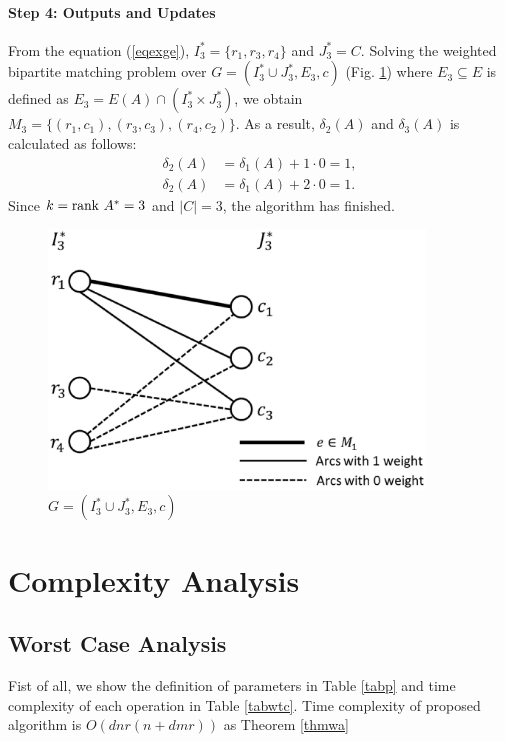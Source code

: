 \begin{example}
\paragraph{Step 4: Outputs and Updates\\} 
From the equation (\ref{eqexge}), $ I^{\ast}_3 = \{ r_1 , r_3, r_4\} $ and $ J^{\ast}_3 = C $.
Solving the weighted bipartite matching problem over $ G = ( I^{\ast}_3 \cup J^{\ast}_3 , E_3 , c ) $ (Fig. \ref{figwm}) where $ E_3 \subseteq E $ is defined as $ E_3 = E(A) \cap ( I^{\ast}_3 \times J^{\ast}_3 ) $, we obtain $ M_3 = \{ (r_1,c_1), (r_3,c_3), (r_4,c_2) \} $.
As a result, $ \delta_2 (A) $ and $ \delta_3 (A) $ is calculated as follows:
\begin{align*}
\delta_2 (A) &= \delta_1 (A) + 1 \cdot 0 = 1,\\
\delta_2 (A) &= \delta_1 (A) + 2 \cdot 0 = 1.
\end{align*}
Since $ k = \mathrm{rank} \  A^{\ast} = 3 $ and $ |C| = 3 $, the algorithm has finished. 

\begin{figure}
\centering
\includegraphics[width=10cm]{figexwm.eps}
\caption{$G= (I^{\ast}_3 \cup J^{\ast}_3,E_3,c)$}
\label{figwm}
\end{figure}

\end{example}


\section{Complexity Analysis}
\label{ca}
\subsection{Worst Case Analysis}
\label{wca}
Fist of all, we show the definition of parameters in Table \ref{tabp} 
and time complexity of each operation in Table \ref{tabwtc}.
Time complexity of proposed algorithm is $ O (dnr(n+dmr)) $ as Theorem \ref{thmwa}

